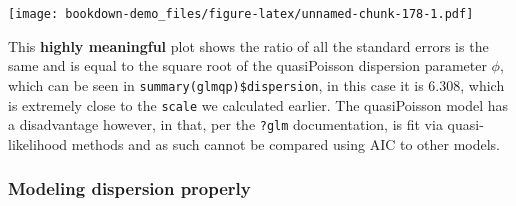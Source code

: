 \documentclass[
]{article}
\newenvironment{Shaded}{\begin{snugshade}}{\end{snugshade}}
\newcommand{\AttributeTok}[1]{\textcolor[rgb]{0.77,0.63,0.00}{#1}}
\newcommand{\DecValTok}[1]{\textcolor[rgb]{0.00,0.00,0.81}{#1}}
\newcommand{\FunctionTok}[1]{\textcolor[rgb]{0.00,0.00,0.00}{#1}}
\newcommand{\NormalTok}[1]{#1}
\newcommand{\OtherTok}[1]{\textcolor[rgb]{0.56,0.35,0.01}{#1}}
\newcommand{\SpecialCharTok}[1]{\textcolor[rgb]{0.00,0.00,0.00}{#1}}
\newcommand{\StringTok}[1]{\textcolor[rgb]{0.31,0.60,0.02}{#1}}
\begin{document}
\begin{Shaded}
\end{Shaded}

\texttt{[image: bookdown-demo\_files/figure-latex/unnamed-chunk-178-1.pdf]}

This \textbf{highly meaningful} plot shows the ratio of all the standard errors is the same and is equal to the square root of the quasiPoisson dispersion parameter \(\phi\), which can be seen in \texttt{summary(glmqp)\$dispersion}, in this case it is 6.308, which is extremely close to the \texttt{scale} we calculated earlier. The quasiPoisson model has a disadvantage however, in that, per the \texttt{?glm} documentation, is fit via quasi-likelihood methods and as such cannot be compared using AIC to other models.

\hypertarget{modeling-dispersion-properly}{%
\subsubsection{Modeling dispersion properly}\label{modeling-dispersion-properly}}
\end{document}
